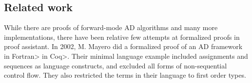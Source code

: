 \subsection{Related work}
While there are proofs of forward-mode AD algorithms\cite{huot2020correctness}\cite{barthe2020versatility} and many more implementations\cite{Shaikha2019}\cite{Margossian2019ARO}, there have been relative few attempts at formalized proofs in proof assistant.
In 2002, M. Mayero did a formalized proof of an AD framework in \<Fortran> in \<Coq>\cite{Mayero:CorrectnessProofAD}.
Their minimal language example included assignments and sequences as language constructs, and excluded all forms of non-sequential control flow.
They also restricted the terms in their language to first order types.


